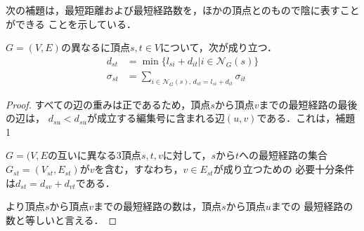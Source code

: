 次の補題は，最短距離および最短経路数を，ほかの頂点とのもので陰に表すことができる
ことを示している．

\begin{lemma-without-proof}
  \label{lemma:distance-of-path}
  $G=(V,E)$の異なるに頂点$s,t\in V$について，次が成り立つ．
  \begin{equation*}
    \begin{aligned}
      d_{st}&=\min\{l_{si}+d_{it}|i\in\mathcal{N}_G(s)\} \\
      \sigma_{st}&=\sum_{i\in\mathcal{N}_G(s),\,d_{st}=l_{si}+d_{it}}\sigma_{it}
    \end{aligned}
  \end{equation*}
\end{lemma-without-proof}
\begin{proof}
  すべての辺の重みは正であるため，頂点$s$から頂点$v$までの最短経路の最後の辺は，
  $d_{su}<d_{su}$が成立する編集号に含まれる辺$(u,v)$である．これは，補題1
  \par $G=(V,E$の互いに異なる3頂点$s,t,v$に対して，$s$から$t$への最短経路の集合
  $G_{st}=(V_{st},E_{st})$が$v$を含む，すなわち，$v\in E_{st}$が成り立つための
  必要十分条件は$d_{st}=d_{sv}+d_{vt}$である．

  より頂点$s$から頂点$v$までの最短経路の数は，頂点$s$から頂点$u$までの
  最短経路の数と等しいと言える．
\end{proof}

